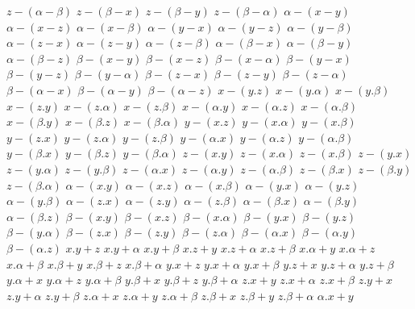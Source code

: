 $ z - (\alpha - \beta) $
$ z - (\beta - x) $
$ z - (\beta - y) $
$ z - (\beta - \alpha) $
$ \alpha - (x - y) $
$ \alpha - (x - z) $
$ \alpha - (x - \beta) $
$ \alpha - (y - x) $
$ \alpha - (y - z) $
$ \alpha - (y - \beta) $
$ \alpha - (z - x) $
$ \alpha - (z - y) $
$ \alpha - (z - \beta) $
$ \alpha - (\beta - x) $
$ \alpha - (\beta - y) $
$ \alpha - (\beta - z) $
$ \beta - (x - y) $
$ \beta - (x - z) $
$ \beta - (x - \alpha) $
$ \beta - (y - x) $
$ \beta - (y - z) $
$ \beta - (y - \alpha) $
$ \beta - (z - x) $
$ \beta - (z - y) $
$ \beta - (z - \alpha) $
$ \beta - (\alpha - x) $
$ \beta - (\alpha - y) $
$ \beta - (\alpha - z) $
$ x - (y . z) $
$ x - (y . \alpha) $
$ x - (y . \beta) $
$ x - (z . y) $
$ x - (z . \alpha) $
$ x - (z . \beta) $
$ x - (\alpha . y) $
$ x - (\alpha . z) $
$ x - (\alpha . \beta) $
$ x - (\beta . y) $
$ x - (\beta . z) $
$ x - (\beta . \alpha) $
$ y - (x . z) $
$ y - (x . \alpha) $
$ y - (x . \beta) $
$ y - (z . x) $
$ y - (z . \alpha) $
$ y - (z . \beta) $
$ y - (\alpha . x) $
$ y - (\alpha . z) $
$ y - (\alpha . \beta) $
$ y - (\beta . x) $
$ y - (\beta . z) $
$ y - (\beta . \alpha) $
$ z - (x . y) $
$ z - (x . \alpha) $
$ z - (x . \beta) $
$ z - (y . x) $
$ z - (y . \alpha) $
$ z - (y . \beta) $
$ z - (\alpha . x) $
$ z - (\alpha . y) $
$ z - (\alpha . \beta) $
$ z - (\beta . x) $
$ z - (\beta . y) $
$ z - (\beta . \alpha) $
$ \alpha - (x . y) $
$ \alpha - (x . z) $
$ \alpha - (x . \beta) $
$ \alpha - (y . x) $
$ \alpha - (y . z) $
$ \alpha - (y . \beta) $
$ \alpha - (z . x) $
$ \alpha - (z . y) $
$ \alpha - (z . \beta) $
$ \alpha - (\beta . x) $
$ \alpha - (\beta . y) $
$ \alpha - (\beta . z) $
$ \beta - (x . y) $
$ \beta - (x . z) $
$ \beta - (x . \alpha) $
$ \beta - (y . x) $
$ \beta - (y . z) $
$ \beta - (y . \alpha) $
$ \beta - (z . x) $
$ \beta - (z . y) $
$ \beta - (z . \alpha) $
$ \beta - (\alpha . x) $
$ \beta - (\alpha . y) $
$ \beta - (\alpha . z) $
$ x . y + z $
$ x . y + \alpha $
$ x . y + \beta $
$ x . z + y $
$ x . z + \alpha $
$ x . z + \beta $
$ x . \alpha + y $
$ x . \alpha + z $
$ x . \alpha + \beta $
$ x . \beta + y $
$ x . \beta + z $
$ x . \beta + \alpha $
$ y . x + z $
$ y . x + \alpha $
$ y . x + \beta $
$ y . z + x $
$ y . z + \alpha $
$ y . z + \beta $
$ y . \alpha + x $
$ y . \alpha + z $
$ y . \alpha + \beta $
$ y . \beta + x $
$ y . \beta + z $
$ y . \beta + \alpha $
$ z . x + y $
$ z . x + \alpha $
$ z . x + \beta $
$ z . y + x $
$ z . y + \alpha $
$ z . y + \beta $
$ z . \alpha + x $
$ z . \alpha + y $
$ z . \alpha + \beta $
$ z . \beta + x $
$ z . \beta + y $
$ z . \beta + \alpha $
$ \alpha . x + y $
